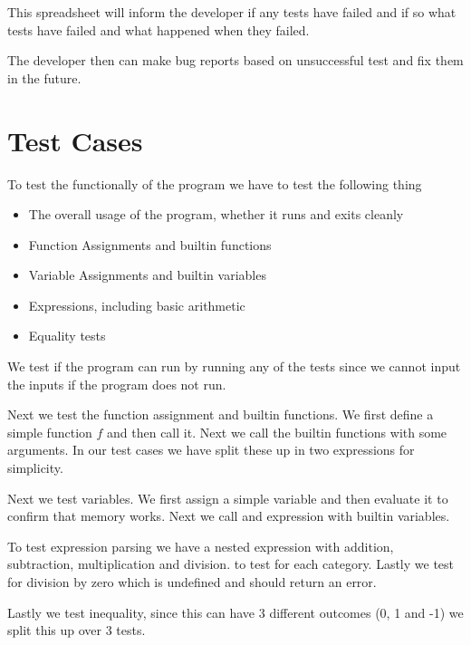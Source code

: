 \documentclass[11pt,a4paper]{article}
\begin{document}
This spreadsheet will inform the developer if any tests have failed
and if so what tests have failed and what happened when they failed.

The developer then can make bug reports based on unsuccessful test and
fix them in the future.


\section{Test Cases}

To test the functionally of the program we have to test the following thing

\begin {itemize}
\item The overall usage of the program, whether it runs and exits cleanly
\item Function Assignments and builtin functions
\item Variable Assignments and builtin variables
\item Expressions, including basic arithmetic
\item Equality tests
\end {itemize}

We test if the program can run by running any of the tests since we
cannot input the inputs if the program does not run.

Next we test the function assignment and builtin functions. We first
define a simple function $f$ and then call it. Next we call the
builtin functions with some arguments. In our test cases we have split
these up in two expressions for simplicity.

Next we test variables. We first assign a simple variable and then
evaluate it to confirm that memory works. Next we call and expression
with builtin variables.

To test expression parsing we have a nested expression with addition,
subtraction, multiplication and division. to test for each category.
Lastly we test for division by zero which is undefined and should return an error.

Lastly we test inequality, since this can have 3 different outcomes
(0, 1 and -1) we split this up over 3 tests.
\end{document}

